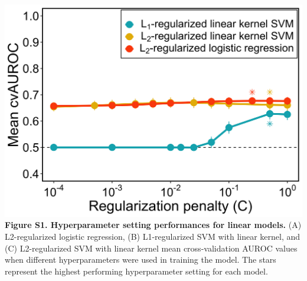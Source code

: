 \documentclass[11pt,]{article}
\begin{document}
\includegraphics{Figure_S1.png} \textbf{Figure S1. Hyperparameter
setting performances for linear models.} (A) L2-regularized logistic
regression, (B) L1-regularized SVM with linear kernel, and (C)
L2-regularized SVM with linear kernel mean cross-validation AUROC values
when different hyperparameters were used in training the model. The
stars represent the highest performing hyperparameter setting for each
model. \newpage
\end{document}
